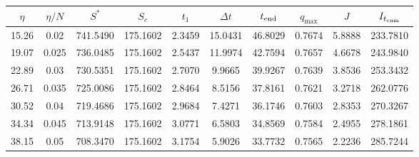 \begin{tabular}{cccccccccc}
\toprule
$\eta$ & $\eta/N$ & $S^*$ & $S_c$ & $t_1$ & $\Delta t$ & $t_{\rm end}$ & $q_{\max}$ & $J$ & $I_{t_{\rm cum}}$ \\
\midrule
15.26 & 0.02 & 741.5490 & 175.1602 & 2.3459 & 15.0431 & 46.8029 & 0.7674 & 5.8888 & 233.7810 \\
19.07 & 0.025 & 736.0485 & 175.1602 & 2.5437 & 11.9974 & 42.7594 & 0.7657 & 4.6678 & 243.9840 \\
22.89 & 0.03 & 730.5351 & 175.1602 & 2.7070 & 9.9665 & 39.9267 & 0.7639 & 3.8536 & 253.3432 \\
26.71 & 0.035 & 725.0086 & 175.1602 & 2.8464 & 8.5156 & 37.8161 & 0.7621 & 3.2718 & 262.0776 \\
30.52 & 0.04 & 719.4686 & 175.1602 & 2.9684 & 7.4271 & 36.1746 & 0.7603 & 2.8353 & 270.3267 \\
34.34 & 0.045 & 713.9148 & 175.1602 & 3.0771 & 6.5803 & 34.8569 & 0.7584 & 2.4955 & 278.1861 \\
38.15 & 0.05 & 708.3470 & 175.1602 & 3.1754 & 5.9026 & 33.7732 & 0.7565 & 2.2236 & 285.7244 \\
\bottomrule
\end{tabular}
